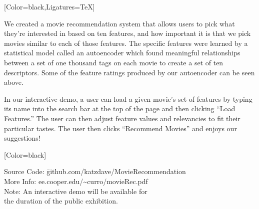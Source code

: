 \documentclass{article}
\begin{document}
\begin{minipage}{15.5in}
{
	[Color=black,Ligatures=TeX]
	\fontsize{0.6in}{8em}\selectfont

	We created a movie recommendation system that allows users to pick what
	they're interested in based on ten features, and how important it is that we
	pick movies similar to each of those features. The specific features were
	learned by a statistical model called an autoencoder which found
	meaningful relationships between a set of one thousand tags on each movie
	to create a set of ten descriptors. Some of the feature ratings produced by
	our autoencoder can be seen above.

	\vspace{0.5in}
	\begin{hangpunct}
	In our interactive demo, a user can load a given movie's set of features by typing 
	its name into the search bar at the top of the page and then clicking
	``Load Features.'' The user can then adjust feature values and relevancies to fit
	their particular tastes. The user then clicks ``Recommend Movies'' and enjoys 
	our suggestions!
	\end{hangpunct}

}
\end{minipage} 
\hfill
\begin{minipage}{10in}
{
	[Color=black]
	\fontsize{0.6in}{8em}\selectfont
	\begin{tabbing}
	Source Code: \= github.com/katzdave/MovieRecommendation\\
	More Info: \> ee.cooper.edu/\textasciitilde{}curro/movieRec.pdf\\
	Note: \> An interactive demo will be available for \\ \> the duration of the public exhibition.
	\end{tabbing}
}
\end{minipage} 
\end{document}
